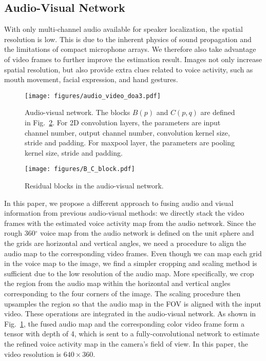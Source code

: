 \documentclass[10pt,twocolumn,letterpaper]{article}
\begin{document}
\subsection{Audio-Visual Network} \label{sec:audio-visual}


With only multi-channel audio available for speaker localization, the spatial resolution is low. This is due to the
inherent physics of sound propagation and the limitations of compact microphone arrays. 
We therefore also take advantage of video frames to further improve the estimation result. 
Images not only increase spatial resolution, but also provide extra clues related to voice activity, such as 
mouth movement, facial expression, and hand gestures.

\begin{figure}[tb]
\centering
\texttt{[image: figures/audio\_video\_doa3.pdf]}
\vspace{-5pt}
	\caption{Audio-visual network. The blocks $B(p)$ and $C(p,q)$ are defined in Fig.~\ref{fig:blocks}.
	For 2D convolution layers, the parameters are input channel number, output channel number, 
	convolution kernel size, stride and padding. For maxpool layer, the parameters are pooling kernel size,
	stride and padding.
	} 
\vspace{-10pt}	
\label{fig:audio-video-doa}	
\end{figure}

\begin{figure}[tb]
\centering
\texttt{[image: figures/B\_C\_block.pdf]}
\vspace{-20pt}
\caption{Residual blocks in the audio-visual network.}
\vspace{-20pt}
\label{fig:blocks}	
\end{figure}

In this paper, we propose a different approach to fusing audio and visual information
from previous audio-visual methods: we directly stack the
video frames with the estimated voice activity map from the audio network. Since the rough 360$^{\circ}$ voice map from the audio network 
is defined on the unit sphere and the grids are horizontal and vertical angles, we need a procedure to align the 
audio map to the corresponding video frames. Even though we can map each grid in the voice map to the image, 
we find a simpler cropping and scaling method is sufficient due to the low resolution of the 
audio map. 
More specifically, we crop the region from the audio map within the 
horizontal and vertical angles corresponding to the four corners of the image. 
The scaling procedure then upsamples the region so that the audio map in the FOV is aligned with the 
input video. These operations are integrated in the audio-visual network.
As shown in Fig.~\ref{fig:audio-video-doa}, the fused audio map and the corresponding color video frame form a tensor with depth of 4,
which is sent to a fully-convolutional network to estimate the refined voice activity map in the camera's field of view.
In this paper, the video resolution is $640\times360$. 
\end{document}
